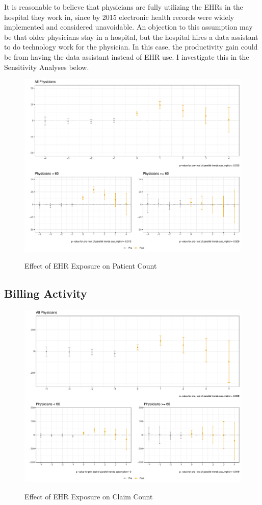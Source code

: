 \documentclass[11pt]{article}
\begin{document}
It is reasonable to believe that physicians are fully utilizing the EHRs in the hospital they work in, since by 2015 electronic health records were widely implemented and considered unavoidable. An objection to this assumption may be that older physicians stay in a hospital, but the hospital hires a data assistant to do technology work for the physician. In this case, the productivity gain could be from having the data assistant instead of EHR use. I investigate this in the Sensitivity Analyses below.

\begin{figure}[ht]
    \centering
    \caption{Effect of EHR Exposure on Patient Count}
    \includegraphics{Objects/patient_plot.pdf}
    \label{fig:patient}
\end{figure}

\subsection{Billing Activity}

\begin{figure}[ht]
    \centering
    \caption{Effect of EHR Exposure on Claim Count}
    \includegraphics{Objects/claim_plot.pdf}
    \label{fig:claim}
\end{figure}
\end{document}
